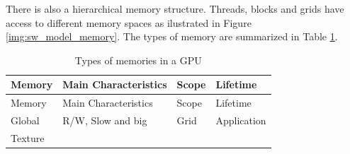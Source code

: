 \documentclass[
  12pt,
  a4paperpaper,
]{report}
\begin{document}
There is also a hierarchical memory
structure. Threads, blocks and grids have access to different memory
spaces as ilustrated in Figure \ref{img:sw_model_memory}. The types of
memory are summarized in Table \ref{tab:memory_hierarchy}.


\begin{longtable}[]{@{}llll@{}}
\caption{Types of memories in a GPU
\label{tab:memory_hierarchy}}\tabularnewline
\toprule
\begin{minipage}[b]{0.13\columnwidth}\raggedright
Memory\strut
\end{minipage} & \begin{minipage}[b]{0.53\columnwidth}\raggedright
Main Characteristics\strut
\end{minipage} & \begin{minipage}[b]{0.09\columnwidth}\raggedright
Scope\strut
\end{minipage} & \begin{minipage}[b]{0.13\columnwidth}\raggedright
Lifetime\strut
\end{minipage}\tabularnewline
\midrule
\endfirsthead
\toprule
\begin{minipage}[b]{0.13\columnwidth}\raggedright
Memory\strut
\end{minipage} & \begin{minipage}[b]{0.53\columnwidth}\raggedright
Main Characteristics\strut
\end{minipage} & \begin{minipage}[b]{0.09\columnwidth}\raggedright
Scope\strut
\end{minipage} & \begin{minipage}[b]{0.13\columnwidth}\raggedright
Lifetime\strut
\end{minipage}\tabularnewline
\midrule
\endhead
\begin{minipage}[t]{0.13\columnwidth}\raggedright
Global\strut
\end{minipage} & \begin{minipage}[t]{0.53\columnwidth}\raggedright
R/W, Slow and big\strut
\end{minipage} & \begin{minipage}[t]{0.09\columnwidth}\raggedright
Grid\strut
\end{minipage} & \begin{minipage}[t]{0.13\columnwidth}\raggedright
Application\strut
\end{minipage}\tabularnewline
\begin{minipage}[t]{0.13\columnwidth}\raggedright
Texture\strut
\end{minipage} & \begin{minipage}[t]{0.53\columnwidth}\raggedright

\end{minipage}
\end{longtable}
\end{document}
